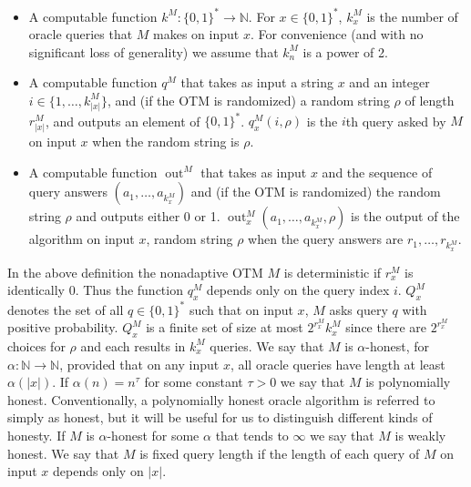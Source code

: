\begin{itemize}
\item A computable function $k^M:\{0,1\}^*\to\mathbb N$. For $x\in\{0,1\}^*$, $k_x^M$ is the number of oracle queries that $M$ makes on input $x$. For convenience (and with no significant loss of generality) we assume that $k_n^M$ is a power of 2.
\item A computable function $q^M$ that takes as input a string $x$ and an integer $i\in\{1,\ldots,k_{|x|}^M\}$, and (if the OTM is randomized) a random string $\rho$ of length $r_{|x|}^M$, and outputs an element of $\{0,1\}^*$. $q_x^M(i,\rho)$ is the $i$th query asked by $M$ on input $x$ when the random string is $\rho$.
\item A computable function $\operatorname{out}^M$ that takes as input $x$ and the sequence of query answers $(a_1,\ldots,a_{k_x^M})$ and (if the OTM is randomized) the random string $\rho$ and outputs either 0 or 1. $\operatorname{out}_x^M(a_1,\ldots,a_{k_x^M},\rho)$ is the output of the algorithm on input $x$, random string $\rho$ when the query answers are $r_1,\ldots,r_{k_x^M}$.
\end{itemize}
In the above definition the nonadaptive OTM $M$ is deterministic if $r_x^M$ is identically 0. Thus the function $q_x^M$ depends only on the query index $i$.
$Q_x^M$ denotes the set of all $q\in\{0,1\}^*$ such that on input $x$, $M$ asks query $q$ with positive probability. $Q_x^M$ is a finite set of size at most $2^{r_x^M}k_x^M$ since there are $2^{r_x^M}$ choices for $\rho$ and each results in $k_x^M$ queries.
We say that $M$ is $\alpha$-honest, for $\alpha:\mathbb N\to\mathbb N$, provided that on any input $x$, all oracle queries have length at least $\alpha(|x|)$. If $\alpha(n)=n^\tau$ for some constant $\tau>0$ we say that $M$ is polynomially honest. Conventionally, a polynomially honest oracle algorithm is referred to simply as honest, but it will be useful for us to distinguish different kinds of honesty.
If $M$ is $\alpha$-honest for some $\alpha$ that tends to $\infty$ we say that $M$ is weakly honest. We say that $M$ is fixed query length if the length of each query of $M$ on input $x$ depends only on $|x|$.
